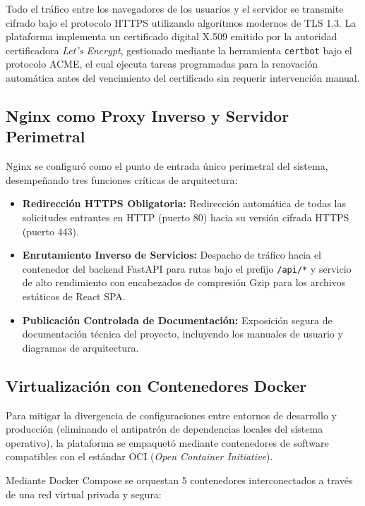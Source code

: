 Todo el tráfico entre los navegadores de los usuarios y el servidor se transmite cifrado bajo el protocolo HTTPS utilizando algoritmos modernos de TLS 1.3. La plataforma implementa un certificado digital X.509 emitido por la autoridad certificadora \textit{Let's Encrypt}, gestionado mediante la herramienta \texttt{certbot} bajo el protocolo ACME, el cual ejecuta tareas programadas para la renovación automática antes del vencimiento del certificado sin requerir intervención manual.

\subsection{Nginx como Proxy Inverso y Servidor Perimetral}

Nginx se configuró como el punto de entrada único perimetral del sistema, desempeñando tres funciones críticas de arquitectura:

\begin{itemize}
    \item \textbf{Redirección HTTPS Obligatoria:} Redirección automática de todas las solicitudes entrantes en HTTP (puerto 80) hacia su versión cifrada HTTPS (puerto 443).
    \item \textbf{Enrutamiento Inverso de Servicios:} Despacho de tráfico hacia el contenedor del backend FastAPI para rutas bajo el prefijo \texttt{/api/*} y servicio de alto rendimiento con encabezados de compresión Gzip para los archivos estáticos de React SPA.
    \item \textbf{Publicación Controlada de Documentación:} Exposición segura de documentación técnica del proyecto, incluyendo los manuales de usuario y diagramas de arquitectura.
\end{itemize}

\subsection{Virtualización con Contenedores Docker}
\label{sec:docker-infra}

Para mitigar la divergencia de configuraciones entre entornos de desarrollo y producción (eliminando el antipatrón de dependencias locales del sistema operativo), la plataforma se empaquetó mediante contenedores de software compatibles con el estándar OCI (\textit{Open Container Initiative}).

Mediante Docker Compose se orquestan 5 contenedores interconectados a través de una red virtual privada y segura:


